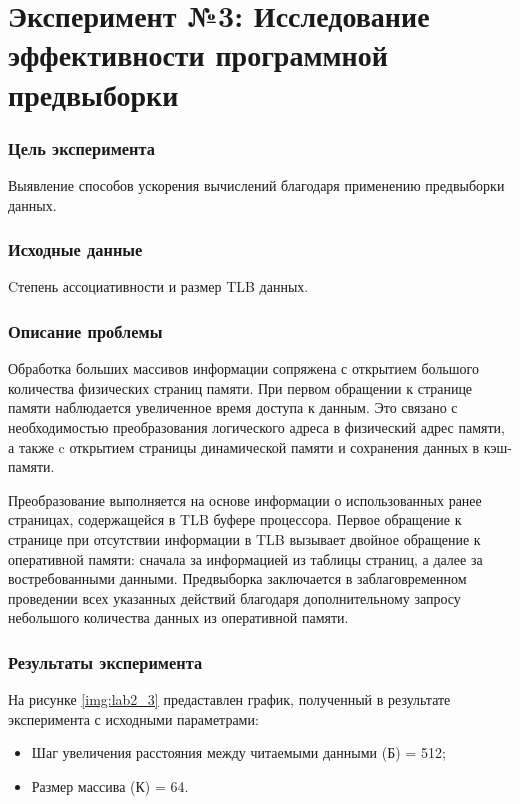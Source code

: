 \chapter*{Эксперимент №3: Исследование эффективности программной предвыборки}

\subsection*{Цель эксперимента}
Выявление способов ускорения вычислений благодаря применению предвыборки данных. 

\subsection*{Исходные данные}
Cтепень ассоциативности и размер TLB данных.

\subsection*{Описание проблемы}
Обработка больших массивов информации сопряжена с открытием большого количества физических страниц памяти. При первом обращении к странице памяти наблюдается увеличенное время доступа к данным. Это связано с необходимостью преобразования логического адреса в физический адрес памяти, а также c открытием страницы динамической памяти и сохранения данных в кэш-памяти.

Преобразование выполняется на основе информации о использованных ранее страницах, содержащейся в TLB буфере процессора. Первое обращение к странице при отсутствии информации в TLB вызывает двойное обращение к оперативной памяти: сначала за информацией из таблицы страниц, а далее за востребованными данными. Предвыборка заключается в заблаговременном проведении всех указанных действий благодаря дополнительному запросу небольшого количества данных из оперативной памяти. 

\subsection*{Результаты эксперимента}
На рисунке \ref{img:lab2_3} предаставлен график, полученный в результате эксперимента с исходными параметрами:
\begin{itemize}
	\item Шаг увеличения расстояния между читаемыми данными
(Б) = 512;
	\item Размер массива (К) = 64.
\end{itemize}


